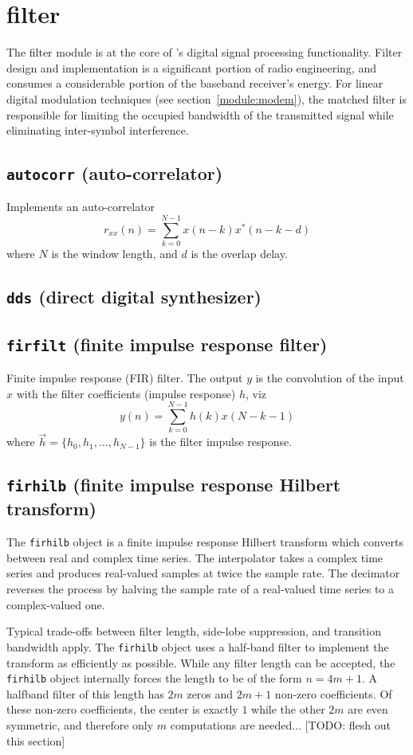 % 
%
\section{filter}
\label{module:filter}
The filter module is at the core of \liquid's digital signal processing
functionality.
Filter design and implementation is a significant portion of radio
engineering, and consumes a considerable portion of the baseband receiver's
energy.
For linear digital modulation techniques (see section~\ref{module:modem}),
the matched filter is responsible for limiting the occupied bandwidth of the
transmitted signal while eliminating inter-symbol interference.

\subsection{{\tt autocorr} (auto-correlator)}
Implements an auto-correlator
\[
    r_{xx}(n) = \sum_{k=0}^{N-1} {x(n-k)x^*(n-k-d)}
\]
where $N$ is the window length, and $d$ is the overlap delay.

\subsection{{\tt dds} (direct digital synthesizer)}

\subsection{{\tt firfilt} (finite impulse response filter)}
Finite impulse response (FIR) filter.
The output $y$ is the convolution of the input $x$ with the filter
coefficients (impulse response) $h$, viz
\[
    y(n) = \sum_{k=0}^{N-1}{ h(k) x(N-k-1) }
\]
where $\vec{h} = \{h_0,h_1,\ldots,h_{N-1}\}$ is the filter impulse response.

\subsection{{\tt firhilb} (finite impulse response Hilbert transform)}
The {\tt firhilb} object is a finite impulse response Hilbert transform which
converts between real and complex time series.
The interpolator takes a complex time series and produces real-valued samples
at twice the sample rate.
The decimator reverses the process by halving the sample rate of a real-valued
time series to a complex-valued one.

Typical trade-offs between filter length, side-lobe suppression, and
transition bandwidth apply.
The {\tt firhilb} object uses a half-band filter to implement the transform as
efficiently as possible.
While any filter length can be accepted, the {\tt firhilb} object internally
forces the length to be of the form $n=4m+1$.
A halfband filter of this length has $2m$ zeros and $2m+1$ non-zero
coefficients.
Of these non-zero coefficients, the center is exactly $1$ while the other $2m$
are even symmetric, and therefore only $m$ computations are needed...
[TODO: flesh out this section]

